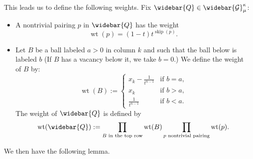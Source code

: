 \documentclass[12pt]{amsart}
\theoremstyle{definition}
\DeclareMathOperator{\wt}{wt}
\DeclareMathOperator{\skipped}{skip}
\newcommand{\Gbar}{\widebar{\mathcal{G}}}
\newcommand{\Qbar}{\widebar{Q}}
\begin{document}
This leads us to define the following weights. Fix $\Qbar\in \Gbar^{\kappa}_\mu$:
\begin{itemize}
    \item A nontrivial pairing $p$ in $\Qbar$ has the weight
    \begin{equation}\label{eq:pairing_weight_unsigned}
  \wt(p)=(1-t)t^{\skipped(p)}.      
    \end{equation}

    \item Let $B$ be a ball labeled $a>0$ in column $k$ and such that the ball below is labeled $b$ (If $B$ has a vacancy below it, we take $b=0$.) We define the weight of $B$ by:
\begin{equation}\label{eq:weights_unsigned_balls}
\wt(B):=
\begin{cases}
    x_k-\frac{1}{t^{n-1}}&\text{if $b=a$,}\\
    x_k&\text{if $b>a$,}\\
    \frac{1}{t^{n-1}}&\text{if $b<a$}.
\end{cases}    
\end{equation}    
The weight of $\Qbar$ is defined by
$$\wt(\Qbar):=\prod_{B \text{ in the top row}}\wt(B) \prod_{p \text{ nontrivial pairing}}\wt(p).$$
\end{itemize}
 We then have the following lemma.
\end{document}
